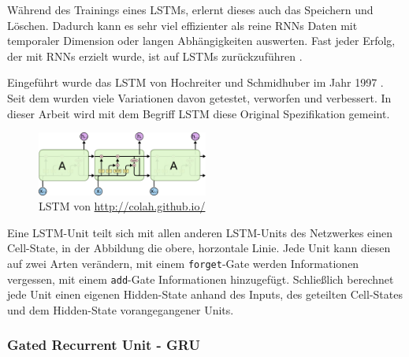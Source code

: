 \documentclass[pdftex,a4paper,halfparskip, article]{scrartcl}
\begin{document}
Während des Trainings eines LSTMs, erlernt dieses auch das Speichern und Löschen. Dadurch kann es sehr viel effizienter als reine RNNs Daten mit temporaler Dimension oder langen Abhängigkeiten auswerten. Fast jeder Erfolg, der mit RNNs erzielt wurde, ist auf LSTMs zurückzuführen \cite{colahsBlogLSTM}. 

Eingeführt wurde das LSTM von Hochreiter und Schmidhuber im Jahr 1997 \cite{LSTM_orig}. Seit dem wurden viele Variationen davon getestet, verworfen und verbessert. In dieser Arbeit wird mit dem Begriff LSTM diese Original Spezifikation gemeint.

\begin{figure}[h]
\centering
\includegraphics[width=0.5\textwidth]{colah_lstm}
\caption{LSTM von \url{http://colah.github.io/}}
\label{fig:gru}

\end{figure}

Eine LSTM-Unit teilt sich mit allen anderen LSTM-Units des Netzwerkes einen Cell-State, in der Abbildung die obere, horzontale Linie. Jede Unit kann diesen auf zwei Arten verändern, mit einem \texttt{forget}-Gate werden Informationen vergessen, mit einem \texttt{add}-Gate Informationen hinzugefügt. Schließlich berechnet jede Unit einen eigenen Hidden-State anhand des Inputs, des geteilten Cell-States und dem Hidden-State vorangegangener Units.


\subsubsection{Gated Recurrent Unit - GRU}
\end{document}
